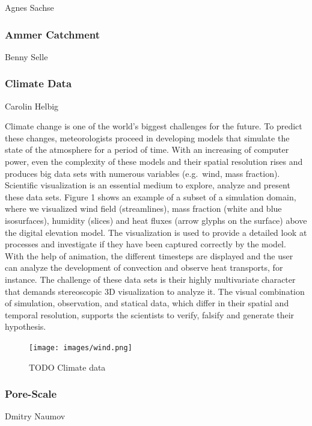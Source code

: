 Agnes Sachse \cite{graebe:modelcare}

\subsubsection{Ammer Catchment}
\label{ammer-catchment}

Benny Selle

\subsubsection{Climate Data}
\label{climate-data}

Carolin Helbig

Climate change is one of the world's biggest challenges for the future.
To predict these changes, meteorologists proceed in developing models
that simulate the state of the atmosphere for a period of time. With an
increasing of computer power, even the complexity of these models and
their spatial resolution rises and produces big data sets with numerous
variables (e.g.~wind, mass fraction). Scientific visualization is an
essential medium to explore, analyze and present these data sets. Figure
1 shows an example of a subset of a simulation domain, where we
visualized wind field (streamlines), mass fraction (white and blue
isosurfaces), humidity (slices) and heat fluxes (arrow glyphs on the
surface) above the digital elevation model. The visualization is used to
provide a detailed look at processes and investigate if they have been
captured correctly by the model. With the help of animation, the
different timesteps are displayed and the user can analyze the
development of convection and observe heat transports, for instance. The
challenge of these data sets is their highly multivariate character that
demands stereoscopic 3D visualization to analyze it. The visual
combination of simulation, observation, and statical data, which differ
in their spatial and temporal resolution, supports the scientists to
verify, falsify and generate their hypothesis.

\begin{figure}
  \texttt{[image: images/wind.png]}
\caption{TODO Climate data}
\label{fig:wind}
\end{figure}

\subsubsection{Pore-Scale}
\label{pore-scale}

Dmitry Naumov

